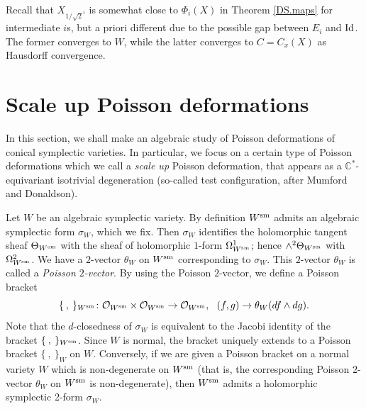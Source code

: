 \documentclass[12pt,a4paper]{amsart}
\theoremstyle{remark}
\theoremstyle{definition}
\def\C{\mathbb{C}}
\begin{document}
Recall that $X_{1/\sqrt{2}^{i}}$  is somewhat close to $\Phi_i(X)$ 
in Theorem \ref{DS.maps} for intermediate $i$s, 
but a priori different 
due to the possible gap between $E_i$ and ${\rm Id}$. The former converges to $W$, while the latter converges to $C=C_x(X)$ 
as Hausdorff convergence. 




\section{Scale up Poisson deformations}\label{sec:PD}

In this section, we shall make an algebraic  
study of Poisson deformations of conical symplectic varieties. In  particular, we focus on 
a certain type of Poisson deformations which we call a 
{\em scale up} Poisson deformation, that appears as a 
$\C^*$-equivariant isotrivial degeneration 
(so-called test configuration, after Mumford and Donaldson). 

Let $W$ be an algebraic symplectic variety. By definition $W^{\rm sm}$ admits an algebraic 
symplectic form $\sigma_W$, which we fix. 
Then $\sigma_W$ identifies 
the holomorphic tangent sheaf 
$\Theta_{W^{\rm sm}}$ with 
the sheaf of holomorphic $1$-form 
$\Omega^1_{W^{\rm sm}}$; hence $\wedge^2 \Theta_{W^{\rm sm}}$ with $\Omega^2_{W^{\rm sm}}$. We have a $2$-vector 
$\theta_W$ on $W^{\rm sm}$ corresponding to $\sigma_W$. This $2$-vector $\theta_W$ is called a {\it Poisson $2$-vector}. By using the 
Poisson $2$-vector, we define a  Poisson bracket $$\{\:, \:\}_{W^{\rm sm}} \colon \mathcal{O}_{W^{\rm sm}} \times \mathcal{O}_{W^{\rm sm}} \to 
\mathcal{O}_{W^{\rm sm}}, \:\:\: (f, g) \to \theta_W(df \wedge dg).$$ Note that the $d$-closedness of $\sigma_W$ is equivalent to the Jacobi 
identity of the bracket $\{\:, \:\}_{W^{\rm sm}}$. Since $W$ is normal, the bracket uniquely extends to a Poisson 
bracket $\{\:, \:\}_W$ on $W$. Conversely, if we are given a Poisson bracket on a normal variety $W$ which is non-degenerate 
on $W^{\rm sm}$ (that is, the corresponding Poisson $2$-vector $\theta_W$ on $W^{\rm sm}$ is non-degenerate), then $W^{\rm sm}$ admits 
a holomorphic symplectic 2-form $\sigma_W$.  
\end{document}
